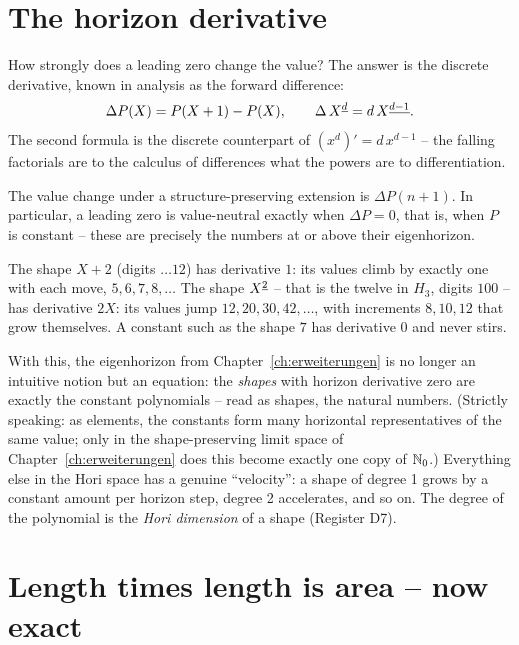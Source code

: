 \section{The horizon derivative}

How strongly does a leading zero change the value? The answer is
the discrete derivative, known in analysis as the forward
difference:
\[
\Delta P(X)=P(X+1)-P(X),
\qquad
\Delta\,X^{\underline{d}}=d\,X^{\underline{d-1}}.
\]
The second formula is the discrete counterpart of
$(x^d)'=d\,x^{d-1}$ -- the falling factorials are to the calculus
of differences what the powers are to differentiation.

\begin{satz}[Register S7]
The value change under a structure-preserving extension is
$\Delta P(n+1)$. In particular, a leading zero is value-neutral
exactly when $\Delta P=0$, that is, when $P$ is constant -- these
are precisely the numbers at or above their eigenhorizon.
\end{satz}

\begin{beispiel}
The shape $X+2$ (digits $\ldots12$) has derivative $1$: its values
climb by exactly one with each move, $5,6,7,8,\ldots$ The shape
$X^{\underline{2}}$ -- that is the twelve in $H_3$, digits $100$ -- has
derivative $2X$: its values jump $12, 20, 30, 42,\ldots$, with
increments $8, 10, 12$ that grow themselves. A constant such as
the shape $7$ has derivative $0$ and never stirs.
\end{beispiel}

With this, the eigenhorizon from Chapter~\ref{ch:erweiterungen} is
no longer an intuitive notion but an equation: the \emph{shapes}
with horizon derivative zero are exactly the constant polynomials
-- read as shapes, the natural numbers. (Strictly speaking: as
elements, the constants form many horizontal representatives of
the same value; only in the shape-preserving limit space of
Chapter~\ref{ch:erweiterungen} does this become exactly one copy
of $\mathbb N_0$.) Everything else in the Hori space has a genuine
``velocity'': a shape of degree 1 grows by a constant amount per
horizon step, degree 2 accelerates, and so on. The degree of the
polynomial is the \emph{Hori dimension} of a shape (Register D7).

\section{Length times length is area -- now exact}


